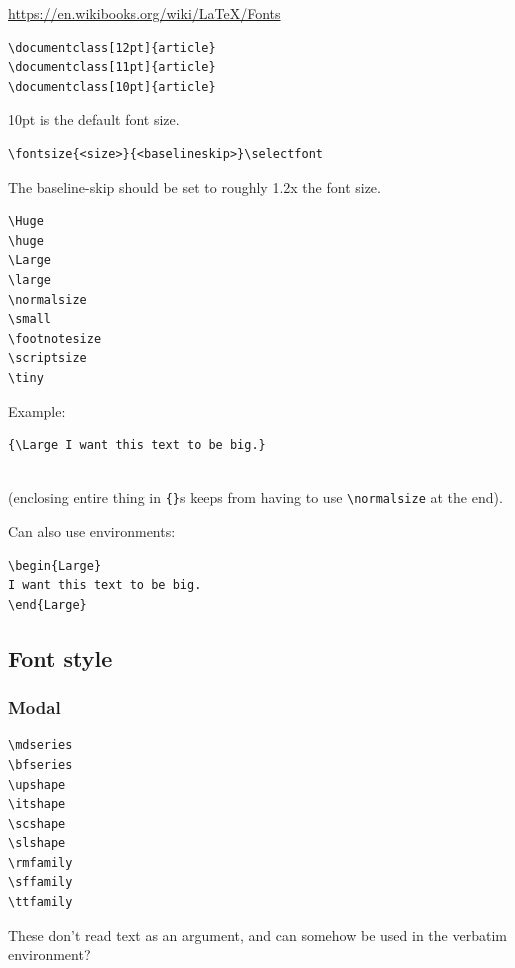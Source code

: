 \documentclass{article}
\begin{document}
\url{https://en.wikibooks.org/wiki/LaTeX/Fonts}

\begin{minipage}[t]{0.5\textwidth}
\begin{lstlisting}
\documentclass[12pt]{article}
\documentclass[11pt]{article}
\documentclass[10pt]{article}
\end{lstlisting}
\end{minipage}
\begin{minipage}[t]{0.5\textwidth}
10pt is the default font size.
\end{minipage}

\begin{minipage}[t]{0.5\textwidth}
\begin{lstlisting}
\fontsize{<size>}{<baselineskip>}\selectfont
\end{lstlisting}
\end{minipage}
\begin{minipage}[t]{0.5\textwidth}
    The baseline-skip should be set to roughly 1.2x the font size.
\end{minipage}

\begin{minipage}[t]{0.5\textwidth}
\begin{lstlisting}
\Huge
\huge
\Large
\large
\normalsize
\small
\footnotesize
\scriptsize
\tiny
\end{lstlisting}
\end{minipage}
\begin{minipage}[t]{0.5\textwidth}
    Example:
\begin{lstlisting}
{\Large I want this text to be big.}
\end{lstlisting}
    \vspace{-2ex}{\Large I want this text to be big.}\\
(enclosing entire thing in \verb|{}|s keeps from having to use
\verb|\normalsize| at the end).

Can also use environments:
\begin{lstlisting}
\begin{Large}
I want this text to be big.
\end{Large}
\end{lstlisting}
\end{minipage}

\subsection{Font style}
\subsubsection{Modal}
\begin{minipage}[t]{0.5\textwidth}
\begin{lstlisting}
\mdseries
\bfseries
\upshape
\itshape
\scshape
\slshape
\rmfamily
\sffamily
\ttfamily
\end{lstlisting}
\end{minipage}
\begin{minipage}[t]{0.5\textwidth}
    These don't read text as an argument, and can somehow be
    used in the verbatim environment?
\end{minipage}
\end{document}
